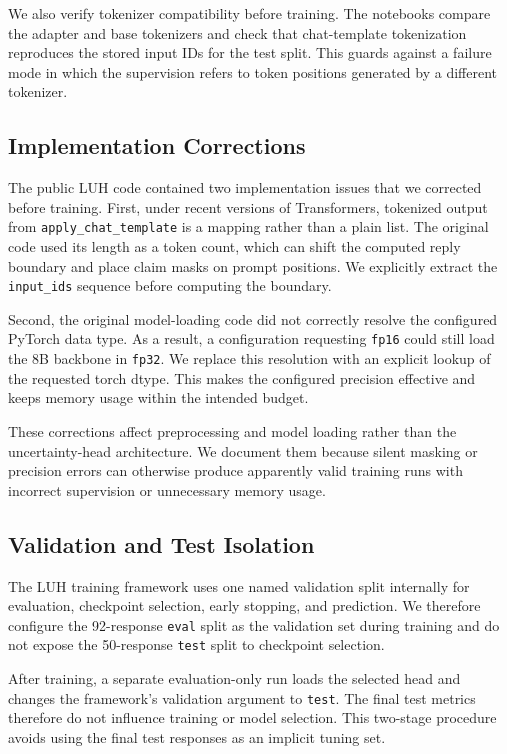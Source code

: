 \documentclass[conference]{IEEEtran}
\begin{document}
We also verify tokenizer compatibility before training. The notebooks compare the adapter and base tokenizers and check that chat-template tokenization reproduces the stored input IDs for the test split. This guards against a failure mode in which the supervision refers to token positions generated by a different tokenizer.

\subsection{Implementation Corrections}

The public LUH code contained two implementation issues that we corrected before training. First, under recent versions of Transformers, tokenized output from \texttt{apply\_chat\_template} is a mapping rather than a plain list. The original code used its length as a token count, which can shift the computed reply boundary and place claim masks on prompt positions. We explicitly extract the \texttt{input\_ids} sequence before computing the boundary.

Second, the original model-loading code did not correctly resolve the configured PyTorch data type. As a result, a configuration requesting \texttt{fp16} could still load the 8B backbone in \texttt{fp32}. We replace this resolution with an explicit lookup of the requested torch dtype. This makes the configured precision effective and keeps memory usage within the intended budget.

These corrections affect preprocessing and model loading rather than the uncertainty-head architecture. We document them because silent masking or precision errors can otherwise produce apparently valid training runs with incorrect supervision or unnecessary memory usage.

\subsection{Validation and Test Isolation}

The LUH training framework uses one named validation split internally for evaluation, checkpoint selection, early stopping, and prediction. We therefore configure the 92-response \texttt{eval} split as the validation set during training and do not expose the 50-response \texttt{test} split to checkpoint selection.

After training, a separate evaluation-only run loads the selected head and changes the framework's validation argument to \texttt{test}. The final test metrics therefore do not influence training or model selection. This two-stage procedure avoids using the final test responses as an implicit tuning set.
\end{document}
